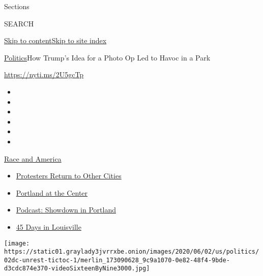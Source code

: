 Sections

SEARCH

\protect\hyperlink{site-content}{Skip to
content}\protect\hyperlink{site-index}{Skip to site index}

\href{/section/politics}{Politics}\textbar{}How Trump's Idea for a Photo
Op Led to Havoc in a Park

\url{https://nyti.ms/2U5gcTp}

\begin{itemize}
\item
\item
\item
\item
\item
\item
\end{itemize}

\href{https://www.nytimes3xbfgragh.onion/news-event/george-floyd-protests-minneapolis-new-york-los-angeles?action=click\&pgtype=Article\&state=default\&region=TOP_BANNER\&context=storylines_menu}{Race
and America}

\begin{itemize}
\tightlist
\item
  \href{https://www.nytimes3xbfgragh.onion/2020/07/26/us/protests-portland-seattle-trump.html?action=click\&pgtype=Article\&state=default\&region=TOP_BANNER\&context=storylines_menu}{Protesters
  Return to Other Cities}
\item
  \href{https://www.nytimes3xbfgragh.onion/2020/07/24/us/portland-oregon-protests-white-race.html?action=click\&pgtype=Article\&state=default\&region=TOP_BANNER\&context=storylines_menu}{Portland
  at the Center}
\item
  \href{https://www.nytimes3xbfgragh.onion/2020/07/23/podcasts/the-daily/portland-protests.html?action=click\&pgtype=Article\&state=default\&region=TOP_BANNER\&context=storylines_menu}{Podcast:
  Showdown in Portland}
\item
  \href{https://www.nytimes3xbfgragh.onion/interactive/2020/07/16/us/black-lives-matter-protests-louisville-breonna-taylor.html?action=click\&pgtype=Article\&state=default\&region=TOP_BANNER\&context=storylines_menu}{45
  Days in Louisville}
\end{itemize}

\texttt{[image: https://static01.graylady3jvrrxbe.onion/images/2020/06/02/us/politics/02dc-unrest-tictoc-1/merlin\_173090628\_9c9a1070-0e82-48f4-9bde-d3cdc874e370-videoSixteenByNine3000.jpg]}

